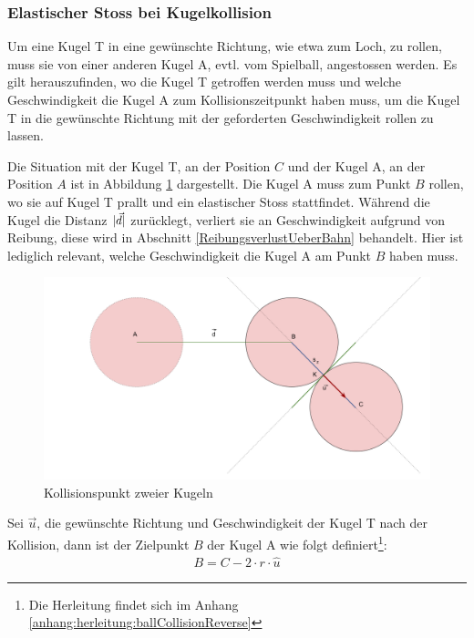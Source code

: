 \subsubsection{Elastischer Stoss bei Kugelkollision}\label{EnergieuebergabeBeiKollision}

Um eine Kugel T in eine gewünschte Richtung, wie etwa zum Loch, zu rollen, muss sie von einer anderen Kugel A,
evtl. vom Spielball, angestossen werden.
Es gilt herauszufinden, wo die Kugel T getroffen werden muss und welche Geschwindigkeit die Kugel A zum Kollisionszeitpunkt
haben muss, um die Kugel T in die gewünschte Richtung mit der geforderten Geschwindigkeit rollen zu lassen.

Die Situation mit der Kugel T, an der Position $C$ und der Kugel A, an der Position $A$ ist in Abbildung \ref{fig:ballCollisionPointReverse}
dargestellt. Die Kugel A muss zum Punkt $B$ rollen, wo sie auf Kugel T prallt und ein elastischer Stoss\cite{wiki.elastischer_stoss_physik:1} stattfindet.
Während die Kugel die Distanz $\lvert \vec{d} \rvert$ zurücklegt, verliert sie an Geschwindigkeit aufgrund von Reibung,
diese wird in Abschnitt \ref{ReibungsverlustUeberBahn} behandelt. Hier ist lediglich relevant, welche Geschwindigkeit
die Kugel A am Punkt $B$ haben muss.

\begin{figure}[h!]
    \begin{center}
        \includegraphics[width=0.6\linewidth]{../common/03_billiard_ai/resources/21_kollisionspunkt_rueckwaerts.png}
    \end{center}
    \caption{Kollisionspunkt zweier Kugeln}
    \label{fig:ballCollisionPointReverse}
\end{figure}

Sei $\vec{u}$, die gewünschte Richtung und Geschwindigkeit der Kugel T nach der Kollision,
dann ist der Zielpunkt $B$ der Kugel A wie folgt definiert\footnote{Die Herleitung findet sich im Anhang \ref{anhang:herleitung:ballCollisionReverse}}:
\begin{align}
    B = C - 2 \cdot r \cdot \hat{u}
\end{align}

